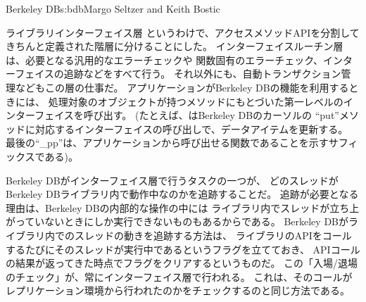 \begin{aosachapter}{Berkeley DB}{s:bdb}{Margo Seltzer and Keith Bostic}
\begin{aosasect1}{ライブラリインターフェイス層}
というわけで、アクセスメソッドAPIを分割してきちんと定義された階層に分けることにした。
インターフェイスルーチン層は、必要となる汎用的なエラーチェックや
関数固有のエラーチェック、インターフェイスの追跡などをすべて行う。
それ以外にも、自動トランザクション管理などもこの層の仕事だ。
アプリケーションがBerkeley DBの機能を利用するときには、
処理対象のオブジェクトが持つメソッドにもとづいた第一レベルのインターフェイスを呼び出す。
(たとえば、はBerkeley DBのカーソルの
``put''メソッドに対応するインターフェイスの呼び出しで、データアイテムを更新する。
最後の``\_pp''は、アプリケーションから呼び出せる関数であることを示すサフィックスである)。

Berkeley DBがインターフェイス層で行うタスクの一つが、
どのスレッドがBerkeley DBライブラリ内で動作中なのかを追跡することだ。
追跡が必要となる理由は、Berkeley DBの内部的な操作の中には
ライブラリ内でスレッドが立ち上がっていないときにしか実行できないものもあるからである。
Berkeley DBがライブラリ内でのスレッドの動きを追跡する方法は、
ライブラリのAPIをコールするたびにそのスレッドが実行中であるというフラグを立てておき、
APIコールの結果が返ってきた時点でフラグをクリアするというものだ。
この「入場/退場のチェック」が、常にインターフェイス層で行われる。
これは、そのコールがレプリケーション環境から行われたのかをチェックするのと同じ方法である。


\end{aosasect1}
\end{aosachapter}
